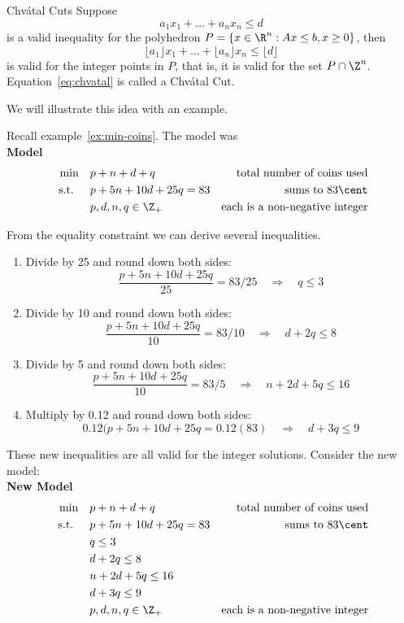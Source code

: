 \documentclass[../open-optimization/open-optimization.tex]{subfiles}
\begin{document}
\begin{general}{Chv\'atal Cuts}{}
Suppose 
\begin{equation}
a_1 x_1 + \dots + a_n x_n \leq d
\end{equation}
is a valid inequality for the polyhedron $P = \{ x \in \R^n : Ax \leq b, x \geq 0\}$, then 
\begin{equation}
\label{eq:chvatal}
\lfloor a_1\rfloor x_1 + \dots + \lfloor a_n\rfloor  x_n \leq \lfloor d\rfloor
\end{equation}
is valid for the integer points in $P$, that is, it is valid for the set $P \cap \Z^n$.  Equation~\eqref{eq:chvatal} is called a Chv\'atal Cut.
\end{general}


We will illustrate this idea with an example.


\begin{example}{}{}
Recall example~\ref{ex:min-coins}.  The model was\\
\textbf{Model}
\begin{align*}
\min \quad & p + n + d + q & \text{ total number of coins used}\\
\text{ s.t. } \quad & p + 5n + 10d + 25 q = 83 & \text{sums to } 83 \cent\\
& p,d,n,q \in \Z_+ & \text{each is a non-negative integer}
\end{align*}

From the equality constraint we can derive several inequalities.
\begin{enumerate}
\item Divide by 25 and round down both sides:
\[
\frac{p + 5n + 10d + 25 q}{25} = 83/25 \quad \Rightarrow \quad q \leq 3 
\]
\item Divide by 10 and round down both sides:
\[
\frac{p + 5n + 10d + 25 q}{10} = 83/10 \quad \Rightarrow \quad d + 2q \leq 8 
\]
\item Divide by 5 and round down both sides:
\[
\frac{p + 5n + 10d + 25 q}{10} = 83/5 \quad \Rightarrow \quad n + 2d  + 5q \leq 16
\]
\item Multiply by 0.12 and round down both sides:
\[
0.12(p + 5n + 10d + 25 q = 0.12 (83) \quad \Rightarrow \quad d  + 3q \leq 9
\]
\end{enumerate}
These new inequalities are all valid for the integer solutions.  Consider the new model:\\

\textbf{New Model}
\begin{align*}
\min \quad & p + n + d + q & \text{ total number of coins used}\\
\text{ s.t. } \quad & p + 5n + 10d + 25 q = 83 & \text{sums to } 83 \cent\\
& q \leq 3\\
& d + 2q \leq 8 \\
& n + 2d  + 5q \leq 16\\
& d  + 3q \leq 9\\
& p,d,n,q \in \Z_+ & \text{each is a non-negative integer}
\end{align*}


\end{example}
\end{document}

